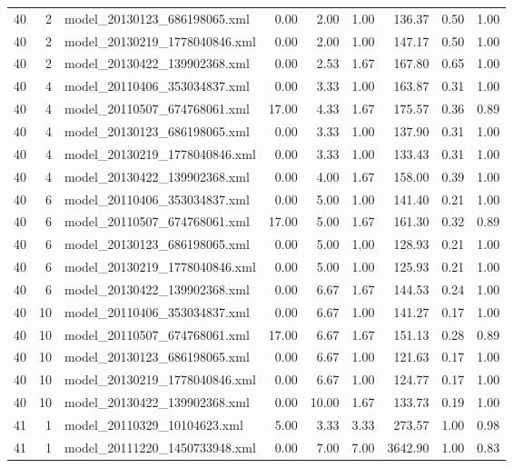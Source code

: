 \begin{table}[ht]
\begin{tabular}{rrlrrrrrr}
   40 &   2 & model\_20130123\_686198065.xml & 0.00 & 2.00 & 1.00 & 136.37 & 0.50 & 1.00 \\ 
   40 &   2 & model\_20130219\_1778040846.xml & 0.00 & 2.00 & 1.00 & 147.17 & 0.50 & 1.00 \\ 
   40 &   2 & model\_20130422\_139902368.xml & 0.00 & 2.53 & 1.67 & 167.80 & 0.65 & 1.00 \\ 
   40 &   4 & model\_20110406\_353034837.xml & 0.00 & 3.33 & 1.00 & 163.87 & 0.31 & 1.00 \\ 
   40 &   4 & model\_20110507\_674768061.xml & 17.00 & 4.33 & 1.67 & 175.57 & 0.36 & 0.89 \\ 
   40 &   4 & model\_20130123\_686198065.xml & 0.00 & 3.33 & 1.00 & 137.90 & 0.31 & 1.00 \\ 
   40 &   4 & model\_20130219\_1778040846.xml & 0.00 & 3.33 & 1.00 & 133.43 & 0.31 & 1.00 \\ 
   40 &   4 & model\_20130422\_139902368.xml & 0.00 & 4.00 & 1.67 & 158.00 & 0.39 & 1.00 \\ 
   40 &   6 & model\_20110406\_353034837.xml & 0.00 & 5.00 & 1.00 & 141.40 & 0.21 & 1.00 \\ 
   40 &   6 & model\_20110507\_674768061.xml & 17.00 & 5.00 & 1.67 & 161.30 & 0.32 & 0.89 \\ 
   40 &   6 & model\_20130123\_686198065.xml & 0.00 & 5.00 & 1.00 & 128.93 & 0.21 & 1.00 \\ 
   40 &   6 & model\_20130219\_1778040846.xml & 0.00 & 5.00 & 1.00 & 125.93 & 0.21 & 1.00 \\ 
   40 &   6 & model\_20130422\_139902368.xml & 0.00 & 6.67 & 1.67 & 144.53 & 0.24 & 1.00 \\ 
   40 &  10 & model\_20110406\_353034837.xml & 0.00 & 6.67 & 1.00 & 141.27 & 0.17 & 1.00 \\ 
   40 &  10 & model\_20110507\_674768061.xml & 17.00 & 6.67 & 1.67 & 151.13 & 0.28 & 0.89 \\ 
   40 &  10 & model\_20130123\_686198065.xml & 0.00 & 6.67 & 1.00 & 121.63 & 0.17 & 1.00 \\ 
   40 &  10 & model\_20130219\_1778040846.xml & 0.00 & 6.67 & 1.00 & 124.77 & 0.17 & 1.00 \\ 
   40 &  10 & model\_20130422\_139902368.xml & 0.00 & 10.00 & 1.67 & 133.73 & 0.19 & 1.00 \\ 
   41 &   1 & model\_20110329\_10104623.xml & 5.00 & 3.33 & 3.33 & 273.57 & 1.00 & 0.98 \\ 
   41 &   1 & model\_20111220\_1450733948.xml & 0.00 & 7.00 & 7.00 & 3642.90 & 1.00 & 0.83 \\ 

\end{tabular}
\end{table}
